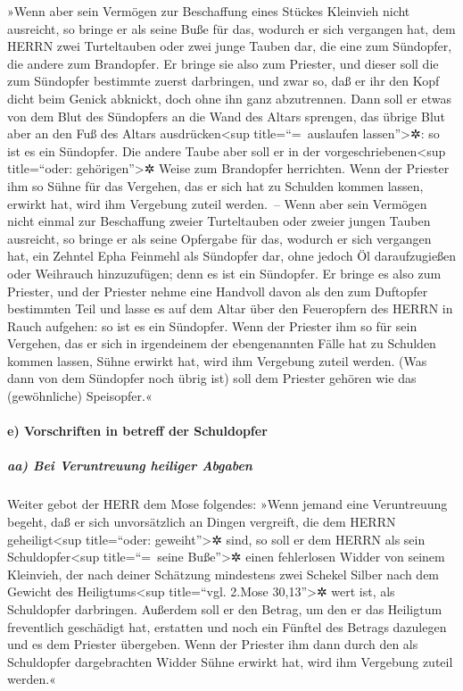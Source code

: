 »Wenn aber sein Vermögen zur Beschaffung eines Stückes
Kleinvieh nicht ausreicht, so bringe er als seine Buße für das, wodurch
er sich vergangen hat, dem HERRN zwei Turteltauben oder zwei junge
Tauben dar, die eine zum Sündopfer, die andere zum Brandopfer.
Er bringe sie also zum Priester, und dieser soll die zum
Sündopfer bestimmte zuerst darbringen, und zwar so, daß er ihr den Kopf
dicht beim Genick abknickt, doch ohne ihn ganz abzutrennen.
Dann soll er etwas von dem Blut des Sündopfers an die Wand
des Altars sprengen, das übrige Blut aber an den Fuß des Altars
ausdrücken\textless sup title=``=~auslaufen lassen''\textgreater✲: so
ist es ein Sündopfer. Die andere Taube aber soll er in
der vorgeschriebenen\textless sup title=``oder: gehörigen''\textgreater✲
Weise zum Brandopfer herrichten. Wenn der Priester ihm so Sühne für das
Vergehen, das er sich hat zu Schulden kommen lassen, erwirkt hat, wird
ihm Vergebung zuteil werden.~-- Wenn aber sein Vermögen
nicht einmal zur Beschaffung zweier Turteltauben oder zweier jungen
Tauben ausreicht, so bringe er als seine Opfergabe für das, wodurch er
sich vergangen hat, ein Zehntel Epha Feinmehl als Sündopfer dar, ohne
jedoch Öl daraufzugießen oder Weihrauch hinzuzufügen; denn es ist ein
Sündopfer. Er bringe es also zum Priester, und der
Priester nehme eine Handvoll davon als den zum Duftopfer bestimmten Teil
und lasse es auf dem Altar über den Feueropfern des HERRN in Rauch
aufgehen: so ist es ein Sündopfer. Wenn der Priester ihm
so für sein Vergehen, das er sich in irgendeinem der ebengenannten Fälle
hat zu Schulden kommen lassen, Sühne erwirkt hat, wird ihm Vergebung
zuteil werden. (Was dann von dem Sündopfer noch übrig ist) soll dem
Priester gehören wie das (gewöhnliche) Speisopfer.«

\hypertarget{e-vorschriften-in-betreff-der-schuldopfer}{%
\paragraph{e) Vorschriften in betreff der
Schuldopfer}\label{e-vorschriften-in-betreff-der-schuldopfer}}

\hypertarget{aa-bei-veruntreuung-heiliger-abgaben}{%
\subparagraph{aa) Bei Veruntreuung heiliger
Abgaben}\label{aa-bei-veruntreuung-heiliger-abgaben}}

Weiter gebot der HERR dem Mose folgendes:
»Wenn jemand eine Veruntreuung begeht, daß er sich
unvorsätzlich an Dingen vergreift, die dem HERRN geheiligt\textless sup
title=``oder: geweiht''\textgreater✲ sind, so soll er dem HERRN als sein
Schuldopfer\textless sup title=``=~seine Buße''\textgreater✲ einen
fehlerlosen Widder von seinem Kleinvieh, der nach deiner Schätzung
mindestens zwei Schekel Silber nach dem Gewicht des
Heiligtums\textless sup title=``vgl. 2.Mose 30,13''\textgreater✲ wert
ist, als Schuldopfer darbringen. Außerdem soll er den
Betrag, um den er das Heiligtum freventlich geschädigt hat, erstatten
und noch ein Fünftel des Betrags dazulegen und es dem Priester
übergeben. Wenn der Priester ihm dann durch den als Schuldopfer
dargebrachten Widder Sühne erwirkt hat, wird ihm Vergebung zuteil
werden.«

